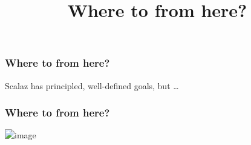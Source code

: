 {


  \begin{frame}[plain] 
  \title{Where to from here?}
  
  \vspace{3em}

  \begin{TitleBoxFuture}
    \begin{center}
    {\Large \inserttitle}
    \end{center}
  \end{TitleBoxFuture}

  \end{frame}
}


\begin{frame}
\frametitle{Where to from here?}
\begin{center}
Scalaz has principled, well-defined goals, but \ldots
\end{center}
\end{frame}


\begin{frame}
\frametitle{Where to from here?}
\begin{center}

\includegraphics<1>[height=5.8cm]{image/marginal-needs.png}

\end{center}
\end{frame}



